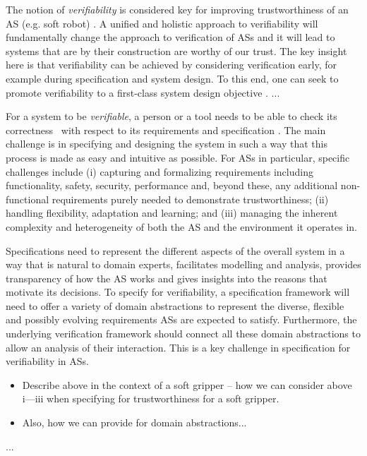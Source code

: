 \documentclass[lettersize,journal]{IEEEtran}
\begin{document}
The notion of \emph{verifiability} is considered key for improving trustworthiness of an AS (e.g. soft robot) \cite{Mousavi2022}. 
A unified and holistic approach to verifiability will fundamentally change the approach to verification of ASs and it will lead to systems that are by their construction are worthy of our trust. 
The key insight here is that verifiability can be achieved by considering verification early, for example during specification and system design. 
To this end, one can seek to promote verifiability to a first-class system design objective \cite{Eder2021}. ...

For a system to be {\em verifiable\/}, a person or a tool needs to be able to check its correctness~\cite{ISO24765:2017} with respect to its requirements and specification \cite{Abeywickrama2022}. 
The main challenge is in specifying and designing the system in such a way that this process is made as easy and intuitive as possible.
%
For ASs in particular, specific challenges include 
%
(i) capturing and formalizing requirements including functionality, safety, security, performance and, beyond these, any additional non-functional requirements purely needed to demonstrate trustworthiness; 
%	 
(ii) handling flexibility, adaptation and learning; and 
%
(iii) managing the inherent complexity and heterogeneity of both the AS and the environment it operates in. 

Specifications need to represent the different aspects of the overall system in a way that is natural to domain experts, facilitates modelling and analysis, provides transparency of how the AS works and gives insights into the reasons that motivate its decisions. 
%
To specify for verifiability, a specification framework will need to offer a variety of domain abstractions to represent the diverse, flexible and possibly evolving requirements ASs are expected to satisfy. 
%
Furthermore, the underlying verification framework should connect all these domain abstractions to allow an analysis of their interaction. This is a key challenge in specification for verifiability in ASs.

\begin{itemize}
	\item Describe above in the context of a soft gripper – how we can consider above i––iii when specifying for trustworthiness for a soft gripper.
	\item Also, how we can provide for domain abstractions...
\end{itemize}
...\\
\end{document}
